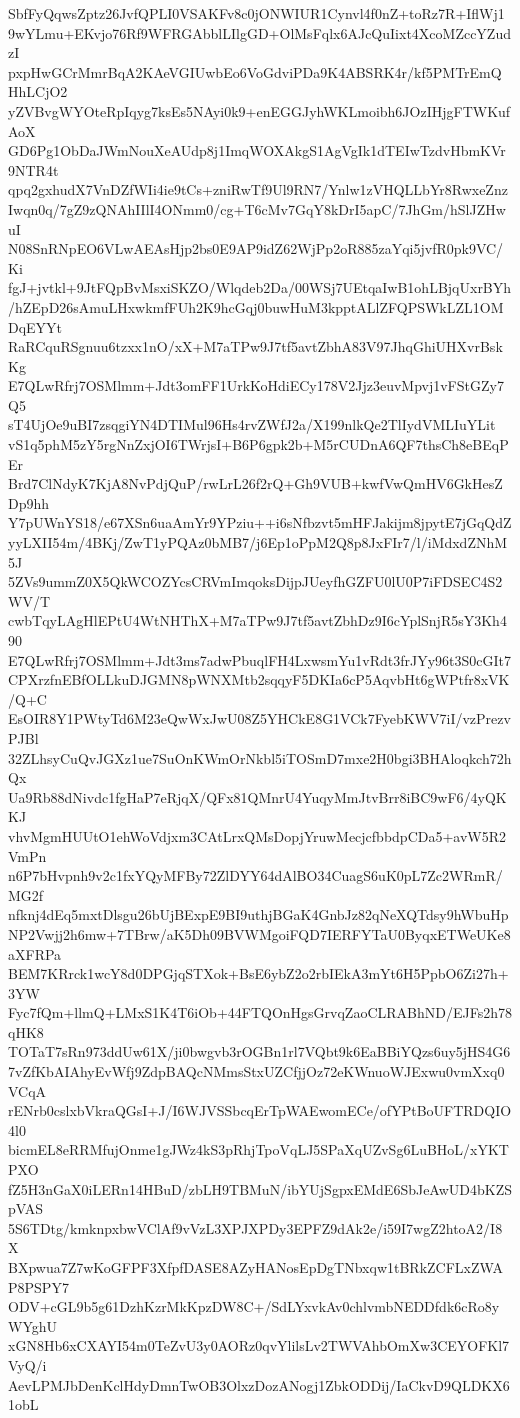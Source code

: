 SbfFyQqwsZptz26JvfQPLI0VSAKFv8c0jONWIUR1Cynvl4f0nZ+toRz7R+IflWj1
9wYLmu+EKvjo76Rf9WFRGAbblLIlgGD+OlMsFqlx6AJcQuIixt4XcoMZccYZudzI
pxpHwGCrMmrBqA2KAeVGIUwbEo6VoGdviPDa9K4ABSRK4r/kf5PMTrEmQHhLCjO2
yZVBvgWYOteRpIqyg7ksEs5NAyi0k9+enEGGJyhWKLmoibh6JOzIHjgFTWKufAoX
GD6Pg1ObDaJWmNouXeAUdp8j1ImqWOXAkgS1AgVgIk1dTEIwTzdvHbmKVr9NTR4t
qpq2gxhudX7VnDZfWIi4ie9tCs+zniRwTf9Ul9RN7/Ynlw1zVHQLLbYr8RwxeZnz
Iwqn0q/7gZ9zQNAhIIlI4ONmm0/cg+T6cMv7GqY8kDrI5apC/7JhGm/hSlJZHwuI
N08SnRNpEO6VLwAEAsHjp2bs0E9AP9idZ62WjPp2oR885zaYqi5jvfR0pk9VC/Ki
fgJ+jvtkl+9JtFQpBvMsxiSKZO/Wlqdeb2Da/00WSj7UEtqaIwB1ohLBjqUxrBYh
/hZEpD26sAmuLHxwkmfFUh2K9hcGqj0buwHuM3kpptALlZFQPSWkLZL1OMDqEYYt
RaRCquRSgnuu6tzxx1nO/xX+M7aTPw9J7tf5avtZbhA83V97JhqGhiUHXvrBskKg
E7QLwRfrj7OSMlmm+Jdt3omFF1UrkKoHdiECy178V2Jjz3euvMpvj1vFStGZy7Q5
sT4UjOe9uBI7zsqgiYN4DTIMul96Hs4rvZWfJ2a/X199nlkQe2TlIydVMLIuYLit
vS1q5phM5zY5rgNnZxjOI6TWrjsI+B6P6gpk2b+M5rCUDnA6QF7thsCh8eBEqPEr
Brd7ClNdyK7KjA8NvPdjQuP/rwLrL26f2rQ+Gh9VUB+kwfVwQmHV6GkHesZDp9hh
Y7pUWnYS18/e67XSn6uaAmYr9YPziu++i6sNfbzvt5mHFJakijm8jpytE7jGqQdZ
yyLXII54m/4BKj/ZwT1yPQAz0bMB7/j6Ep1oPpM2Q8p8JxFIr7/l/iMdxdZNhM5J
5ZVs9ummZ0X5QkWCOZYcsCRVmImqoksDijpJUeyfhGZFU0lU0P7iFDSEC4S2WV/T
cwbTqyLAgHlEPtU4WtNHThX+M7aTPw9J7tf5avtZbhDz9I6cYplSnjR5sY3Kh490
E7QLwRfrj7OSMlmm+Jdt3ms7adwPbuqlFH4LxwsmYu1vRdt3frJYy96t3S0cGIt7
CPXrzfnEBfOLLkuDJGMN8pWNXMtb2sqqyF5DKIa6cP5AqvbHt6gWPtfr8xVK/Q+C
EsOIR8Y1PWtyTd6M23eQwWxJwU08Z5YHCkE8G1VCk7FyebKWV7iI/vzPrezvPJBl
32ZLhsyCuQvJGXz1ue7SuOnKWmOrNkbl5iTOSmD7mxe2H0bgi3BHAloqkch72hQx
Ua9Rb88dNivdc1fgHaP7eRjqX/QFx81QMnrU4YuqyMmJtvBrr8iBC9wF6/4yQKKJ
vhvMgmHUUtO1ehWoVdjxm3CAtLrxQMsDopjYruwMecjcfbbdpCDa5+avW5R2VmPn
n6P7bHvpnh9v2c1fxYQyMFBy72ZlDYY64dAlBO34CuagS6uK0pL7Zc2WRmR/MG2f
nfknj4dEq5mxtDlsgu26bUjBExpE9BI9uthjBGaK4GnbJz82qNeXQTdsy9hWbuHp
NP2Vwjj2h6mw+7TBrw/aK5Dh09BVWMgoiFQD7IERFYTaU0ByqxETWeUKe8aXFRPa
BEM7KRrck1wcY8d0DPGjqSTXok+BsE6ybZ2o2rbIEkA3mYt6H5PpbO6Zi27h+3YW
Fyc7fQm+llmQ+LMxS1K4T6iOb+44FTQOnHgsGrvqZaoCLRABhND/EJFs2h78qHK8
TOTaT7sRn973ddUw61X/ji0bwgvb3rOGBn1rl7VQbt9k6EaBBiYQzs6uy5jHS4G6
7vZfKbAIAhyEvWfj9ZdpBAQcNMmsStxUZCfjjOz72eKWnuoWJExwu0vmXxq0VCqA
rENrb0cslxbVkraQGsI+J/I6WJVSSbcqErTpWAEwomECe/ofYPtBoUFTRDQIO4l0
bicmEL8eRRMfujOnme1gJWz4kS3pRhjTpoVqLJ5SPaXqUZvSg6LuBHoL/xYKTPXO
fZ5H3nGaX0iLERn14HBuD/zbLH9TBMuN/ibYUjSgpxEMdE6SbJeAwUD4bKZSpVAS
5S6TDtg/kmknpxbwVClAf9vVzL3XPJXPDy3EPFZ9dAk2e/i59I7wgZ2htoA2/I8X
BXpwua7Z7wKoGFPF3XfpfDASE8AZyHANosEpDgTNbxqw1tBRkZCFLxZWAP8PSPY7
ODV+cGL9b5g61DzhKzrMkKpzDW8C+/SdLYxvkAv0chlvmbNEDDfdk6cRo8yWYghU
xGN8Hb6xCXAYI54m0TeZvU3y0AORz0qvYlilsLv2TWVAhbOmXw3CEYOFKl7VyQ/i
AevLPMJbDenKclHdyDmnTwOB3OlxzDozANogj1ZbkODDij/IaCkvD9QLDKX61obL
